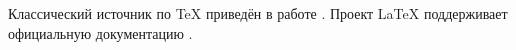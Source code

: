\documentclass[a4paper,12pt]{article}
\begin{document}
Классический источник по TeX приведён в работе \citep{knuth1984texbook}.
Проект LaTeX поддерживает официальную документацию \citep{latexproject}.



\end{document}
